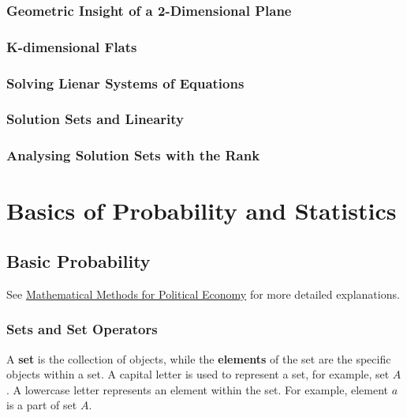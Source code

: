\documentclass[
  a4paper,
]{report}
\begin{document}
\section{Geometric Insight of a 2-Dimensional
Plane}\label{geometric-insight-of-a-2-dimensional-plane}

\section{K-dimensional Flats}\label{k-dimensional-flats}

\section{Solving Lienar Systems of
Equations}\label{solving-lienar-systems-of-equations}

\section{Solution Sets and Linearity}\label{solution-sets-and-linearity}

\section{Analysing Solution Sets with the
Rank}\label{analysing-solution-sets-with-the-rank}

\part{Basics of Probability and
Statistics}\label{basics-of-probability-and-statistics}

\chapter{Basic Probability}\label{basic-probability}

See
\href{https://kevinli03.github.io/politicaleconomy/maths.pdf}{Mathematical
Methods for Political Economy} for more detailed explanations.

\section{Sets and Set Operators}\label{sets-and-set-operators}

A \textbf{set} is the collection of objects, while the \textbf{elements}
of the set are the specific objects within a set. A capital letter is
used to represent a set, for example, set \(A\). A lowercase letter
represents an element within the set. For example, element \(a\) is a
part of set \(A\).
\end{document}
